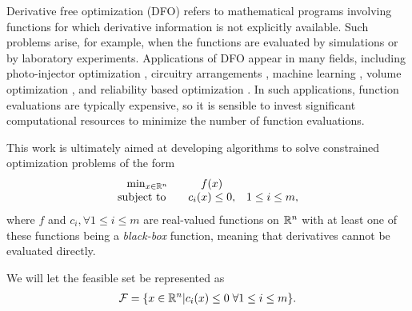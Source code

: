 

Derivative free optimization (DFO) refers to mathematical programs involving functions for which derivative information is not explicitly available.
Such problems arise, for example, when the functions are evaluated by simulations or by laboratory experiments.  Applications of DFO appear in many fields, including photo-injector optimization \cite{1742-6596-874-1-012062}, circuitry arrangements \cite{PLOSKAS201816}, machine learning \cite{KS2018}, volume optimization \cite{Cheng2017}, and reliability based optimization \cite{Gao2017}.
In such applications, function evaluations are typically expensive, so it is sensible to invest significant computational resources to minimize the number of function evaluations.

This work is ultimately aimed at developing algorithms to solve constrained optimization problems of the form 
\begin{align}
\begin{array}{ccl} \min_{x \in \mathbb R^n} & f(x) \\
\mbox{subject to} \quad & c_i(x) \le 0, & 1 \le i \le m,
\end{array}
\label{the_dfo_problem}
\end{align}
where 
$f$ and $c_i, \forall 1 \le i \le m$ are real-valued functions on $\mathbb R^n$ with at least one of these functions being a {\em black-box} function, meaning that derivatives cannot be evaluated directly.

We will let the feasible set be represented as 
\begin{align}
{\mathcal F} = \{x \in \mathbb R^n | c_i(x) \le 0 \; \forall 1 \le i \le m \}.
\end{align}

